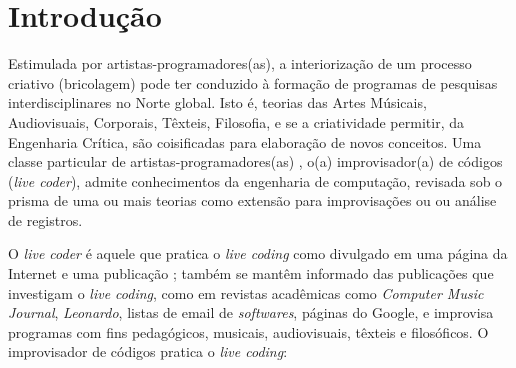 \chapter*{Introdução} 


Estimulada por artistas-programadores(as), a interiorização de um processo criativo (bricolagem) pode ter conduzido à formação de programas de pesquisas interdisciplinares no Norte global. Isto é, teorias das Artes Músicais, Audiovisuais, Corporais, Têxteis, Filosofia, e se a criatividade permitir, da Engenharia Crítica, são coisificadas para elaboração de novos conceitos. Uma classe particular de artistas-programadores(as) \cite[p.~16]{McLean2011}, o(a) improvisador(a) de códigos (\emph{live coder}), admite conhecimentos da engenharia de computação, revisada sob o prisma de uma ou mais teorias   como extensão para improvisações ou ou análise de registros.

O \emph{live coder} é aquele que pratica o \emph{live coding} como divulgado em uma página da Internet e uma publicação \cite{ward_live_2004}; também se mantêm informado das publicações que investigam o \emph{live coding}, como em revistas acadêmicas como \emph{Computer Music Journal}, \emph{Leonardo}, listas de email de \emph{softwares}, páginas do Google, e improvisa programas com fins pedagógicos, musicais, audiovisuais, têxteis e filosóficos. O improvisador de códigos pratica o \emph{live coding}:




